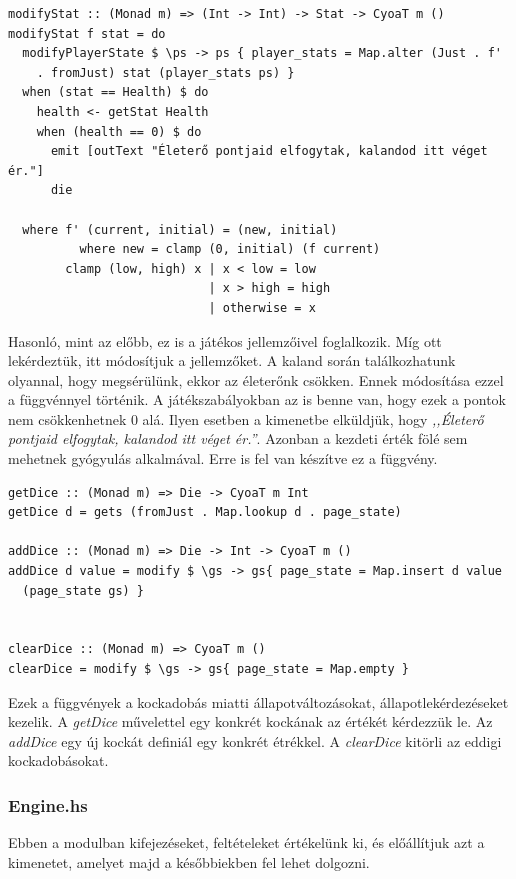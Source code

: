 \documentclass[12pt,a4paper,oneside]{report}
\begin{document}
    \begin{verbatim}
modifyStat :: (Monad m) => (Int -> Int) -> Stat -> CyoaT m ()
modifyStat f stat = do
  modifyPlayerState $ \ps -> ps { player_stats = Map.alter (Just . f'
    . fromJust) stat (player_stats ps) }
  when (stat == Health) $ do
    health <- getStat Health
    when (health == 0) $ do
      emit [outText "Életerő pontjaid elfogytak, kalandod itt véget ér."]
      die

  where f' (current, initial) = (new, initial)
          where new = clamp (0, initial) (f current)
        clamp (low, high) x | x < low = low
                            | x > high = high
                            | otherwise = x
    \end{verbatim}
    Hasonló, mint az előbb, ez is a játékos jellemzőivel
    foglalkozik. Míg ott lekérdeztük, itt módosítjuk a jellemzőket. A
    kaland során találkozhatunk olyannal, hogy megsérülünk, ekkor az
    életerőnk csökken. Ennek módosítása ezzel a függvénnyel
    történik. A játékszabályokban az is benne van, hogy ezek a pontok
    nem csökkenhetnek 0 alá. Ilyen esetben a kimenetbe elküldjük, hogy
    \emph{,,Életerő pontjaid elfogytak, kalandod itt véget ér.''}. Azonban a
    kezdeti érték fölé sem mehetnek gyógyulás alkalmával. Erre is fel
    van készítve ez a függvény.

    \begin{verbatim}
getDice :: (Monad m) => Die -> CyoaT m Int
getDice d = gets (fromJust . Map.lookup d . page_state)

addDice :: (Monad m) => Die -> Int -> CyoaT m ()
addDice d value = modify $ \gs -> gs{ page_state = Map.insert d value
  (page_state gs) }


clearDice :: (Monad m) => CyoaT m ()
clearDice = modify $ \gs -> gs{ page_state = Map.empty }
  \end{verbatim}

    Ezek a függvények a kockadobás miatti állapotváltozásokat,
    állapotlekérdezéseket kezelik. A \emph{getDice} művelettel egy konkrét
    kockának az értékét kérdezzük le. Az \emph{addDice} egy új kockát
    def{}iniál egy konkrét étrékkel. A \emph{clearDice} kitörli az eddigi kockadobásokat.

      \subsubsection{Engine.hs}
      Ebben a modulban kifejezéseket, feltételeket értékelünk ki, és
      előállítjuk azt a kimenetet, amelyet majd a későbbiekben fel
      lehet dolgozni.
\end{document}
